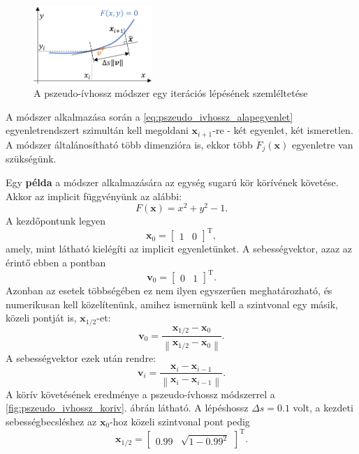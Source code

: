 \begin{figure}[ht]
	\centering
	\includegraphics[width=0.4\textwidth]{graphics/pszeudo_ivhossz_szemleltet.png}
	\caption{A pszeudo-ívhossz módszer egy iterációs lépésének szemléltetése}\label{fig:pszeudo_ivhossz_szemleltet}
\end{figure}

A módszer alkalmazása során a \eqref{eq:pszeudo_ivhossz_alapegyenlet} egyenletrendszert szimultán kell megoldani $\mathbf{x}_{i+1}$-re - két egyenlet, két ismeretlen.
A módszer általánosítható több dimenzióra is, ekkor több $F_j(\mathbf{x})$ egyenletre van szük\-sé\-günk.

Egy \textbf{példa} a módszer alkalmazására az egység sugarú kör körívének követése.
Akkor az implicit függvényünk az alábbi:
\begin{equation}
F(\mathbf{x}) = x^2 + y^2 -1.
\end{equation}
A kezdőpontunk legyen
\begin{equation}
\mathbf{x}_0 = \begin{bmatrix}
1 & 0
\end{bmatrix}^\mathrm{T},
\end{equation}
amely, mint látható kielégíti az implicit egyenletünket.
A sebességvektor, azaz az érintő ebben a pontban
\begin{equation}
\mathbf{v}_0 = \begin{bmatrix}
0 & 1
\end{bmatrix}^\mathrm{T}.
\end{equation}
Azonban az esetek többségében ez nem ilyen egyszerűen meghatározható, és numerikusan kell közelítenünk, amihez ismernünk kell a szintvonal egy másik, közeli pontját is, $\mathbf{x}_{1/2}$-et:
\begin{equation}
\mathbf{v}_0 = \frac{\mathbf{x}_{1/2} - \mathbf{x}_{0}}{\left \| \mathbf{x}_{1/2} - \mathbf{x}_{0} \right \|}.
\end{equation}
A sebességvektor ezek után rendre:
\begin{equation}
\mathbf{v}_i = \frac{\mathbf{x}_{i} - \mathbf{x}_{i-1}}{\left \| \mathbf{x}_{i} - \mathbf{x}_{i-1} \right \|}.
\end{equation}
A körív követésének eredménye a pszeudo-ívhossz módszerrel a \ref{fig:pszeudo_ivhossz_koriv}. ábrán látható.
A lépéshossz $\Delta s = 0.1$ volt, a kezdeti sebességbecsléshez az $\mathbf{x}_0$-hoz közeli szintvonal pont pedig
\begin{equation}
\mathbf{x}_{1/2} = \begin{bmatrix}
0.99 & \sqrt{1 - 0.99^2}
\end{bmatrix}^\mathrm{T}.
\end{equation}

